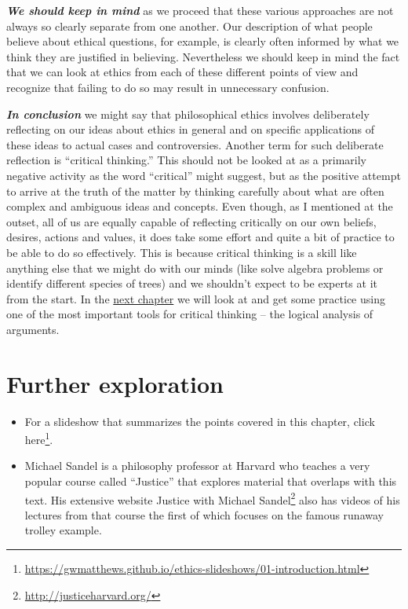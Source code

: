 \documentclass[12pt, openany]{book}
\renewcommand{\href}[2]{#2\footnote{\url{#1}}}
\begin{document}
\textbf{\emph{We should keep in mind}} as we proceed that these various approaches are not always so clearly separate from one another. Our description of what people believe about ethical questions, for example, is clearly often informed by what we think they are justified in believing. Nevertheless we should keep in mind the fact that we can look at ethics from each of these different points of view and recognize that failing to do so may result in unnecessary confusion.

\textbf{\emph{In conclusion}} we might say that philosophical ethics involves deliberately reflecting on our ideas about ethics in general and on specific applications of these ideas to actual cases and controversies. Another term for such deliberate reflection is ``critical thinking.'' This should not be looked at as a primarily negative activity as the word ``critical'' might suggest, but as the positive attempt to arrive at the truth of the matter by thinking carefully about what are often complex and ambiguous ideas and concepts. Even though, as I mentioned at the outset, all of us are equally capable of reflecting critically on our own beliefs, desires, actions and values, it does take some effort and quite a bit of practice to be able to do so effectively. This is because critical thinking is a skill like anything else that we might do with our minds (like solve algebra problems or identify different species of trees) and we shouldn't expect to be experts at it from the start. In the \protect\hyperlink{logic}{next chapter} we will look at and get some practice using one of the most important tools for critical thinking -- the logical analysis of arguments.

\hypertarget{further-exploration}{%
\section*{Further exploration}\label{further-exploration}}


\begin{itemize}
\item
  For a slideshow that summarizes the points covered in this chapter, \href{https://gwmatthews.github.io/ethics-slideshows/01-introduction.html}{click here}.
\item
  Michael Sandel is a philosophy professor at Harvard who teaches a very popular course called ``Justice'' that explores material that overlaps with this text. His extensive website \href{http://justiceharvard.org/}{Justice with Michael Sandel} also has videos of his lectures from that course the first of which focuses on the famous runaway trolley example.
\end{itemize}
\end{document}
